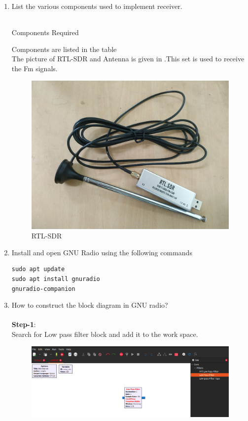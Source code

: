 \begin{enumerate}[label=\arabic*.,ref=\thesection.\theenumi]
\item List the various components used to implement receiver.
\\
\solution
\\
\begin{table}[!ht]
  \centering
  
  \caption{Components Required}
  \label{tab:rxcomponents}
\end{table}
Components are listed in the table \\
The picture of RTL-SDR and Antenna is given in .This set is used to receive the Fm signals.
\begin{figure}[H]
\centering
\includegraphics[width=0.5\columnwidth]{fm/rx/figs/rtl-sdr.png}
\caption{RTL-SDR}
\label{fig:rtl-sdr}
\end{figure}
\item Install and open GNU Radio using the following commands
\\
\begin{lstlisting}
sudo apt update
sudo apt install gnuradio
gnuradio-companion
\end{lstlisting}
\item How to construct the block diagram in GNU radio? \\
	\solution  \\
\textbf{Step-1}:\\
Search for Low pass filter block and add it to the work space.
\begin{figure}[H]
\centering
\includegraphics[width=\columnwidth]{fm/rx/figs/add.png}

\end{figure}
\end{enumerate}
